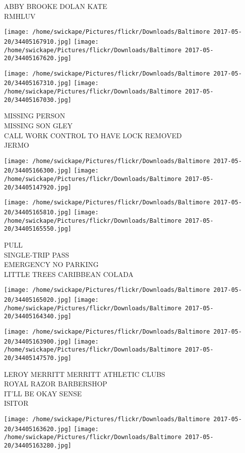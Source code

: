 \documentclass[10pt,letterpaper]{article}
\begin{document}
ABBY BROOKE DOLAN KATE\\
RMHLUV
\pagebreak

\texttt{[image: /home/swickape/Pictures/flickr/Downloads/Baltimore 2017-05-20/34405167910.jpg]}
\texttt{[image: /home/swickape/Pictures/flickr/Downloads/Baltimore 2017-05-20/34405167620.jpg]}

\texttt{[image: /home/swickape/Pictures/flickr/Downloads/Baltimore 2017-05-20/34405167310.jpg]}
\texttt{[image: /home/swickape/Pictures/flickr/Downloads/Baltimore 2017-05-20/34405167030.jpg]}

MISSING PERSON\\
MISSING SON GLEY\\
CALL WORK CONTROL TO HAVE LOCK REMOVED\\
JERMO
\pagebreak

\texttt{[image: /home/swickape/Pictures/flickr/Downloads/Baltimore 2017-05-20/34405166300.jpg]}
\texttt{[image: /home/swickape/Pictures/flickr/Downloads/Baltimore 2017-05-20/34405147920.jpg]}

\texttt{[image: /home/swickape/Pictures/flickr/Downloads/Baltimore 2017-05-20/34405165810.jpg]}
\texttt{[image: /home/swickape/Pictures/flickr/Downloads/Baltimore 2017-05-20/34405165550.jpg]}

PULL\\
SINGLE{-}TRIP PASS\\
EMERGENCY NO PARKING\\
LITTLE TREES CARIBBEAN COLADA
\pagebreak

\texttt{[image: /home/swickape/Pictures/flickr/Downloads/Baltimore 2017-05-20/34405165020.jpg]}
\texttt{[image: /home/swickape/Pictures/flickr/Downloads/Baltimore 2017-05-20/34405164340.jpg]}

\texttt{[image: /home/swickape/Pictures/flickr/Downloads/Baltimore 2017-05-20/34405163900.jpg]}
\texttt{[image: /home/swickape/Pictures/flickr/Downloads/Baltimore 2017-05-20/34405147570.jpg]}

LEROY MERRITT MERRITT ATHLETIC CLUBS\\
ROYAL RAZOR BARBERSHOP\\
IT'LL BE OKAY SENSE\\
ISITOR
\pagebreak

\texttt{[image: /home/swickape/Pictures/flickr/Downloads/Baltimore 2017-05-20/34405163620.jpg]}
\texttt{[image: /home/swickape/Pictures/flickr/Downloads/Baltimore 2017-05-20/34405163280.jpg]}
\end{document}
